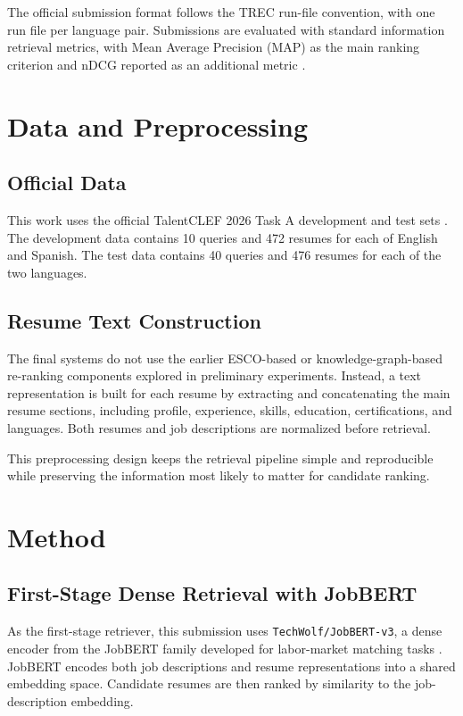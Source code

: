 \documentclass[
]{ceurart}
\begin{document}
The official submission format follows the TREC run-file convention, with one run file
per language pair. Submissions are evaluated with standard information retrieval
metrics, with Mean Average Precision (MAP) as the main ranking criterion and nDCG
reported as an additional metric \cite{talentclef2026eval,talentclef2026format}.

\section{Data and Preprocessing}

\subsection{Official Data}

This work uses the official TalentCLEF 2026 Task A development and test sets
\cite{talentclef2026task}. The development data contains 10 queries and 472 resumes
for each of English and Spanish. The test data contains 40 queries and 476 resumes
for each of the two languages.

\subsection{Resume Text Construction}

The final systems do not use the earlier ESCO-based or knowledge-graph-based re-ranking
components explored in preliminary experiments. Instead, a text representation is built
for each resume by extracting and concatenating the main resume sections, including
profile, experience, skills, education, certifications, and languages. Both resumes
and job descriptions are normalized before retrieval.

This preprocessing design keeps the retrieval pipeline simple and reproducible while
preserving the information most likely to matter for candidate ranking.

\section{Method}

\subsection{First-Stage Dense Retrieval with JobBERT}

As the first-stage retriever, this submission uses \texttt{TechWolf/JobBERT-v3}, a dense encoder
from the JobBERT family developed for labor-market matching tasks \cite{jobbert}.
JobBERT encodes both job descriptions and resume representations into a shared
embedding space. Candidate resumes are then ranked by similarity to the job-description
embedding.
\end{document}
